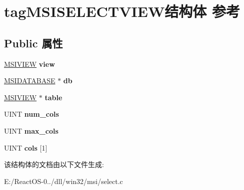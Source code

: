 \hypertarget{structtag_m_s_i_s_e_l_e_c_t_v_i_e_w}{}\section{tag\+M\+S\+I\+S\+E\+L\+E\+C\+T\+V\+I\+E\+W结构体 参考}
\label{structtag_m_s_i_s_e_l_e_c_t_v_i_e_w}
\subsection*{Public 属性}
\begin{DoxyCompactItemize}
\item 
\mbox{\label{structtag_m_s_i_s_e_l_e_c_t_v_i_e_w_a506449a00f9b9a0a2e60828ad4fb7f9b}} 
\hyperlink{structtag_m_s_i_v_i_e_w}{M\+S\+I\+V\+I\+EW} {\bfseries view}
\item 
\mbox{\label{structtag_m_s_i_s_e_l_e_c_t_v_i_e_w_ac2a1520226132126266c77a0c2db2b38}} 
\hyperlink{structtag_m_s_i_d_a_t_a_b_a_s_e}{M\+S\+I\+D\+A\+T\+A\+B\+A\+SE} $\ast$ {\bfseries db}
\item 
\mbox{\label{structtag_m_s_i_s_e_l_e_c_t_v_i_e_w_aa37e3ecd687da3a37796555d8f7b3f4c}} 
\hyperlink{structtag_m_s_i_v_i_e_w}{M\+S\+I\+V\+I\+EW} $\ast$ {\bfseries table}
\item 
\mbox{\label{structtag_m_s_i_s_e_l_e_c_t_v_i_e_w_ac44119c32ca7f24cf5438f50813c8130}} 
U\+I\+NT {\bfseries num\+\_\+cols}
\item 
\mbox{\label{structtag_m_s_i_s_e_l_e_c_t_v_i_e_w_a09feb63764f568b34315330e45b3c100}} 
U\+I\+NT {\bfseries max\+\_\+cols}
\item 
\mbox{\label{structtag_m_s_i_s_e_l_e_c_t_v_i_e_w_a4d8697558ccb0860e9c60474ec641379}} 
U\+I\+NT {\bfseries cols} \mbox{[}1\mbox{]}
\end{DoxyCompactItemize}


该结构体的文档由以下文件生成\+:\begin{DoxyCompactItemize}
\item 
E\+:/\+React\+O\+S-\/0../dll/win32/msi/select.\+c\end{DoxyCompactItemize}
